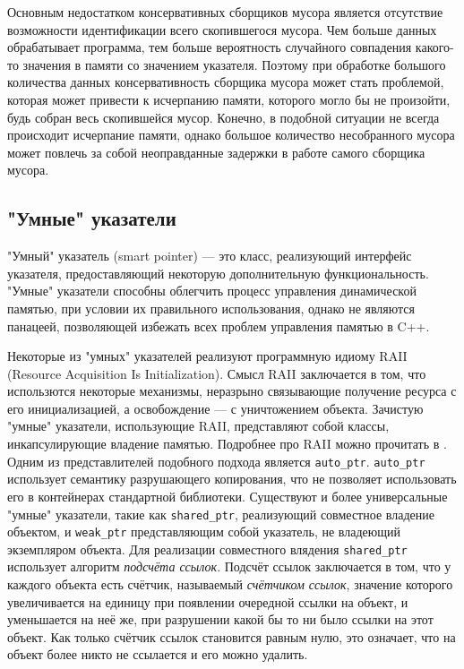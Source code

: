 Основным недостатком консервативных сборщиков мусора является отсутствие возможности идентификации
всего скопившегося мусора. Чем больше данных обрабатывает программа, тем больше вероятность случайного совпадения
какого-то значения в памяти со значением указателя. Поэтому при обработке большого количества данных
консервативность сборщика мусора может стать проблемой, которая может привести к исчерпанию памяти,
которого могло бы не произойти, будь собран весь скопившейся мусор.
Конечно, в подобной ситуации не всегда происходит исчерпание памяти, однако большое количество несобранного мусора
может повлечь за собой неоправданные задержки в работе самого сборщика мусора.

\subsection{"Умные" указатели}
"Умный" указатель (smart pointer) --- это класс, реализующий интерфейс указателя, предоставляющий некоторую
дополнительную функциональность.
"Умные" указатели способны облегчить процесс управления динамической памятью, при условии их правильного использования,
однако не являются панацеей, позволяющей избежать всех проблем управления памятью в C++\cite{smartPointers}.

Некоторые из "умных" указателей реализуют программную идиому RAII (Resource Acquisition Is Initialization).
Смысл RAII заключается в том, что использются некоторые механизмы, неразрыно связывающие получение ресурса с его инициализацией,
а освобождение --- с уничтожением объекта. Зачистую "умные" указатели, использующие RAII, представляют собой классы,
инкапсулирующие владение памятью. Подробнее про RAII можно прочитать в \cite{CppPrinciples}.
Одним из представлителей подобного подхода является \lstinline[language= cpp]{auto_ptr}.
\lstinline[language= cpp]{auto_ptr} использует семантику разрушающего копирования, что не позволяет использовать его
в контейнерах стандартной библиотеки\cite{smartPointers}.
Существуют и более универсальные "умные" указатели, такие как \lstinline[language= cpp]{shared_ptr},
реализующий совместное владение объектом, и \lstinline[language= cpp]{weak_ptr} представляющим собой указатель,
не владеющий экземпляром объекта.
Для реализации совместного влядения \lstinline[language= cpp]{shared_ptr} использует алгоритм \textit{подсчёта ссылок}.
Подсчёт ссылок заключается в том, что у каждого объекта есть счётчик, называемый \textit{счётчиком ссылок},
значение которого увеличивается на единицу
при появлении очередной ссылки на объект, и уменьшается на неё же, при разрушении какой бы то ни было ссылки на этот объект.
Как только счётчик ссылок становится равным нулю, это означает, что на объект более никто не ссылается и его можно удалить.

